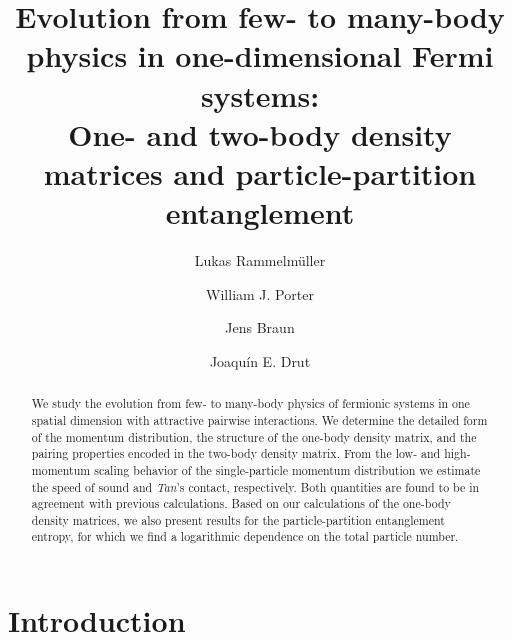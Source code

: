 \documentclass[pra,aps,groupedaddress,floatfix,twocolumn,superscriptaddress,showpacs,nofootinbib]{revtex4-1}
\begin{document}
\title{{Evolution from few- to many-body physics in one-dimensional Fermi systems:} \\
One- and two-body density matrices and particle-partition entanglement}

\author{Lukas Rammelm\"uller}

\author{William J. Porter}

\author{Jens Braun}

\author{Joaqu\'{i}n E. Drut}

\begin{abstract}
{We study the evolution from few- to many-body physics of fermionic systems in one spatial dimension
with attractive pairwise interactions. We} determine the detailed form of the
momentum distribution, the structure of the one-body density matrix, and the pairing properties encoded in the
two-body density matrix. {From the low- and high-momentum scaling behavior of the single-particle momentum distribution we estimate
the speed of sound and {\it Tan}'s contact, respectively. Both quantities are found to be in agreement with previous calculations.
Based} on our calculations of the one-body
density matrices, we also present results for the particle-partition entanglement entropy, for which {we find a logarithmic
dependence on the} total particle {number.}
\end{abstract}

\maketitle


\section{Introduction}
\end{document}

